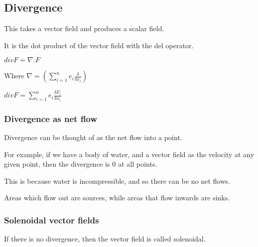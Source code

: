 
\subsection{Divergence}

This takes a vector field and produces a scalar field.

It is the dot product of the vector field with the del operator.

\(div F = \nabla . F\)

Where \(\nabla =(\sum_{i=1}^n e_i\frac{\delta }{\delta x_i})\)

\(div F = \sum_{i=1}^n e_i\frac{\delta F_i}{\delta x_i}\)

\subsubsection{Divergence as net flow}

Divergence can be thought of as the net flow into a point.

For example, if we have a body of water, and a vector field as the velocity at any given point, then the divergence is \(0\) at all points.

This is because water is incompressible, and so there can be no net flows.

Areas which flow out are sources, while areas that flow inwards are sinks.

\subsubsection{Solenoidal vector fields}

If there is no divergence, then the vector field is called solenoidal.

